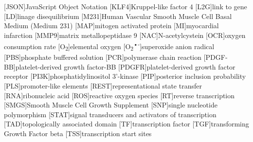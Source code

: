 \begin{acronym}
                                          [JSON]{JavaScript Object Notation}
                                               [KLF4]{Kruppel-like factor 4}
                                                          [L2G]{link to gene}
                                                   [LD]{linage disequilibrium}
         [M231]{Human Vascular Smooth Muscle Cell Basal Medium (Medium 231)}
                                             [MAP]{mitogen activated protein}
                                                   [MI]{myocardial infarction}
                                           [MMP9]{matrix metallopeptidase 9}
                                                       [NAC]{N-acetylcystein}
                                               [OCR]{oxygen consumption rate}
                                        [O\textsubscript{2}]{elemental oxygen}
           [O\textsubscript{2}\textsuperscript{•-}]{superoxide anion radical}
                                           [PBS]{phosphate buffered solution}
                                             [PCR]{polymerase chain reaction}
                                [PDGF-BB]{platelet-derived growth factor-BB}
                           [PDGFR]{platelet-derived growth factor receptor}
                                      [PI3K]{phosphatidylinositol 3'-kinase}
                                       [PIP]{posterior inclusion probability}
                                                [PLS]{promoter-like elements}
                                     [REST]{representational state transfer}
                                                      [RNA]{ribonucleic acid}
                                               [ROS]{reactive oxygen species}
                                                   [RT]{reverse transcription}
                                [SMGS]{Smooth Muscle Cell Growth Supplement}
                                        [SNP]{single nucleotide polymorphism}
                  [STAT]{signal transducers and activators of transcription}
                                       [TAD]{topologically associated domain}
                                                    [TF]{transcription factor}
                                  [TGF\beta]{transforming Growth Factor beta}
                                             [TSS]{transcription start sites}

\end{acronym}

